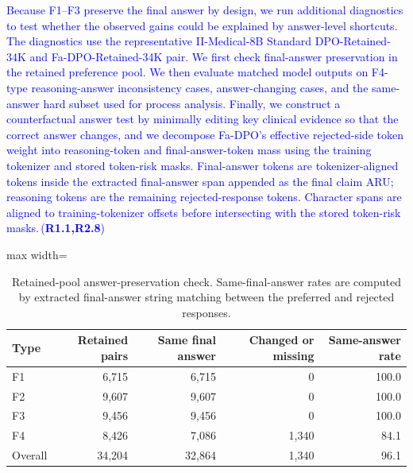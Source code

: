 \documentclass[a4paper,fleqn,doubleblind]{cas-sc}
\DeclareRobustCommand{\added}[1]{\textcolor{blue}{#1}}
\DeclareRobustCommand{\revtag}[1]{\textcolor{blue}{\scriptsize\,(\textbf{#1})}}
\begin{document}
\added{Because F1--F3 preserve the final answer by design, we run additional diagnostics to test whether the observed gains could be explained by answer-level shortcuts. The diagnostics use the representative II-Medical-8B Standard DPO-Retained-34K and Fa-DPO-Retained-34K pair. We first check final-answer preservation in the retained preference pool. We then evaluate matched model outputs on F4-type reasoning-answer inconsistency cases, answer-changing cases, and the same-answer hard subset used for process analysis. Finally, we construct a counterfactual answer test by minimally editing key clinical evidence so that the correct answer changes, and we decompose Fa-DPO's effective rejected-side token weight into reasoning-token and final-answer-token mass using the training tokenizer and stored token-risk masks. Final-answer tokens are tokenizer-aligned tokens inside the extracted final-answer span appended as the final claim ARU; reasoning tokens are the remaining rejected-response tokens. Character spans are aligned to training-tokenizer offsets before intersecting with the stored token-risk masks.}\revtag{R1.1,R2.8}

\begin{table}[htbp]
    \centering
    \begingroup\color{blue}
    \footnotesize
    \caption{Retained-pool answer-preservation check. Same-final-answer rates are computed by extracted final-answer string matching between the preferred and rejected responses.}
    \label{tab:answer_preservation_check}
    \begin{adjustbox}{max width=\columnwidth}
    \begin{tabular}{lrrrr}
        \toprule
        \textbf{Type} & \textbf{Retained pairs} & \textbf{Same final answer} & \textbf{Changed or missing} & \textbf{Same-answer rate} \\
        \midrule
        F1 & 6,715 & 6,715 & 0 & 100.0 \\
        F2 & 9,607 & 9,607 & 0 & 100.0 \\
        F3 & 9,456 & 9,456 & 0 & 100.0 \\
        F4 & 8,426 & 7,086 & 1,340 & 84.1 \\
        \midrule
        Overall & 34,204 & 32,864 & 1,340 & 96.1 \\
        \bottomrule
    \end{tabular}
    \end{adjustbox}
    \endgroup
\end{table}
\end{document}
